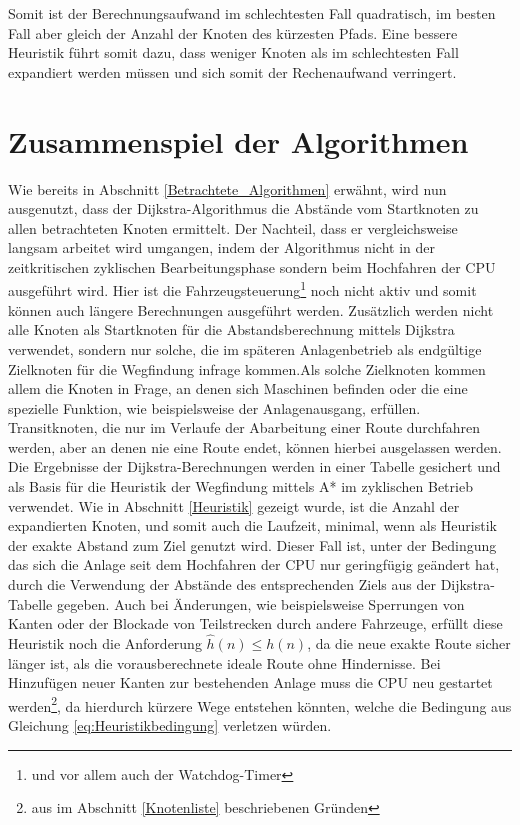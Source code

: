 		Somit ist der Berechnungsaufwand im schlechtesten Fall quadratisch, im besten Fall aber gleich der Anzahl der Knoten des kürzesten Pfads. Eine bessere Heuristik führt somit dazu, dass weniger Knoten als im schlechtesten Fall expandiert werden müssen und sich somit der Rechenaufwand verringert.
		
	\section{Zusammenspiel der Algorithmen}
		\label{Verwendung_Alg}
		Wie bereits in Abschnitt \ref{Betrachtete_Algorithmen} erwähnt, wird nun ausgenutzt, dass der Dijkstra-Algorithmus die Abstände vom Startknoten zu allen betrachteten Knoten ermittelt.  Der Nachteil, dass er vergleichsweise langsam arbeitet wird umgangen, indem der Algorithmus nicht in der zeitkritischen zyklischen Bearbeitungsphase sondern beim Hochfahren der CPU ausgeführt wird. Hier ist die Fahrzeugsteuerung\footnote{und vor allem auch der Watchdog-Timer} noch nicht aktiv und somit können auch längere Berechnungen ausgeführt werden. Zusätzlich werden nicht alle Knoten als Startknoten für die Abstandsberechnung mittels Dijkstra verwendet, sondern nur solche, die im späteren Anlagenbetrieb als endgültige Zielknoten für die Wegfindung infrage kommen.Als solche Zielknoten kommen allem die Knoten in Frage, an denen sich Maschinen befinden oder die eine spezielle Funktion, wie beispielsweise der Anlagenausgang, erfüllen. Transitknoten, die nur im Verlaufe der Abarbeitung einer Route durchfahren werden, aber an denen nie eine Route endet, können hierbei ausgelassen werden.
		\\[4pt]
		Die Ergebnisse der Dijkstra-Berechnungen werden in einer Tabelle gesichert und als Basis für die Heuristik der Wegfindung mittels A* im zyklischen Betrieb verwendet. Wie in  Abschnitt \ref{Heuristik} gezeigt wurde, ist die Anzahl der expandierten Knoten, und somit auch die Laufzeit, minimal, wenn als Heuristik der exakte Abstand zum Ziel genutzt wird. Dieser Fall ist, unter der Bedingung das sich die Anlage seit dem Hochfahren der CPU nur geringfügig geändert hat, durch die Verwendung der Abstände des entsprechenden Ziels aus der Dijkstra-Tabelle gegeben. Auch bei Änderungen, wie beispielsweise Sperrungen von Kanten oder der Blockade von Teilstrecken durch andere Fahrzeuge, erfüllt diese Heuristik noch die Anforderung $\hat{h}(n)\le h(n)$, da die neue exakte Route sicher länger ist, als die vorausberechnete ideale Route ohne Hindernisse. Bei Hinzufügen neuer Kanten zur bestehenden Anlage muss die CPU neu gestartet werden\footnote{aus im Abschnitt \ref{Knotenliste} beschriebenen Gründen}, da hierdurch kürzere Wege entstehen könnten, welche die Bedingung aus Gleichung \ref{eq:Heuristikbedingung} verletzen würden.
		
		
				





